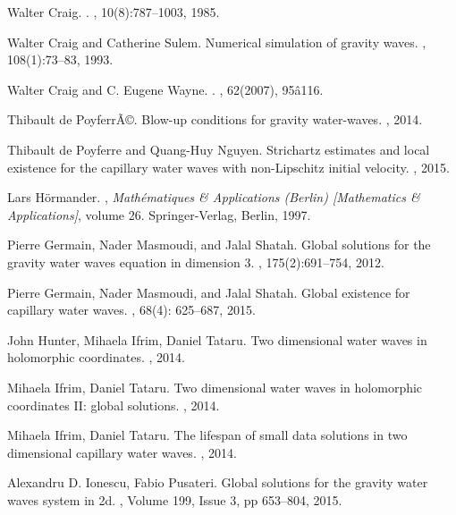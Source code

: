 \documentclass[11pt,english]{smfart}
\theoremstyle{plain}
\theoremstyle{definition}
\numberwithin{equation}{section}
\begin{document}
\begin{thebibliography}{10}
Walter Craig.
.
,
  10(8):787--1003, 1985.

Walter Craig and Catherine Sulem. 
\newblock Numerical simulation of gravity waves. 
, 108(1):73--83, 1993.

Walter  Craig and C. Eugene Wayne.
.
, 62(2007), 95â116.

Thibault de PoyferrÃ©.
\newblock Blow-up conditions for gravity water-waves.
, 2014.

Thibault de Poyferre and Quang-Huy Nguyen.
\newblock Strichartz estimates and local existence for the capillary water waves with non-Lipschitz initial velocity.
, 2015.

Lars H{\"o}rmander.
,
 {\em Math{\'e}matiques \& Applications (Berlin) [Mathematics \&
  Applications]}, volume 26.
\newblock Springer-Verlag, Berlin, 1997.

Pierre Germain, Nader Masmoudi, and Jalal Shatah.
\newblock Global solutions for the gravity water waves equation in dimension 3.
, 175(2):691--754, 2012.
 
Pierre Germain, Nader Masmoudi, and Jalal Shatah.
\newblock Global existence for capillary water waves.
, 68(4): 625--687, 2015.

John Hunter, Mihaela Ifrim, Daniel Tataru.
\newblock Two dimensional water waves in holomorphic coordinates.
, 2014.

Mihaela Ifrim, Daniel Tataru.
\newblock Two dimensional water waves in holomorphic coordinates II: global solutions.
, 2014.

Mihaela Ifrim, Daniel Tataru.
\newblock 
The lifespan of small data solutions in two dimensional capillary water waves.
, 2014.

Alexandru D. Ionescu, Fabio Pusateri.
\newblock Global solutions for the gravity water waves system in 2d.
,  Volume 199, Issue 3, pp 653--804, 2015.


\end{thebibliography}
\end{document}
